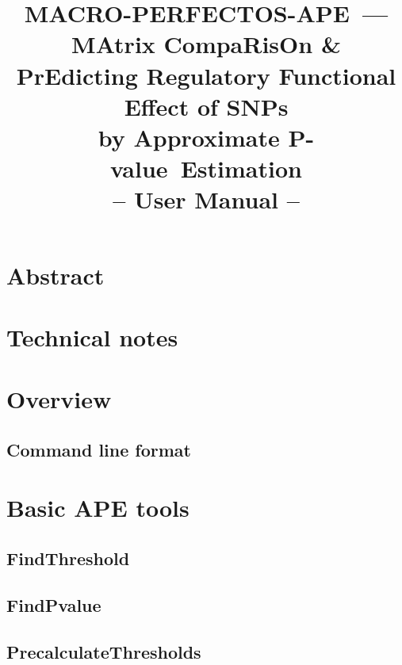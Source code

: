\documentclass[]{article}
\newcommand*{\pvalue}{\mbox{P-value}}
\begin{document}
\title{
MACRO-PERFECTOS-APE~---\\{\small MAtrix CompaRisOn \&\\ PrEdicting Regulatory Functional Effect of SNPs\\ by Approximate \pvalue\ Estimation}\\
-- User Manual --
}
\maketitle

\section{Abstract}\label{abstract}


\section{Technical notes}\label{technical-notes}


\section{Overview}\label{overview}

  \subsection{Command line format}\label{command-line-format}
  

\section{Basic APE tools}\label{ape-introduction}


  \subsection{FindThreshold}\label{find-threshold}
  

  \subsection{FindPvalue}\label{find-pvalue}
  

  \subsection{PrecalculateThresholds}\label{precalculate-thresholds}
  
\end{document}
